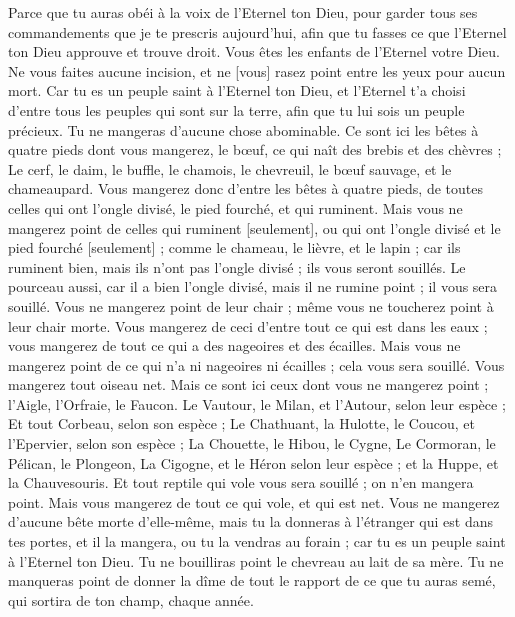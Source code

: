 \begin{multicols}{2}
Parce que tu auras obéi à la voix de l'Eternel ton Dieu, pour garder tous ses commandements que je te prescris aujourd'hui, afin que tu fasses ce que l'Eternel ton Dieu approuve et trouve droit.
\VerseOne{}Vous êtes les enfants de l'Eternel votre Dieu. Ne vous faites aucune incision, et ne [vous] rasez point entre les yeux pour aucun mort.
Car tu es un peuple saint à l'Eternel ton Dieu, et l'Eternel t'a choisi d'entre tous les peuples qui sont sur la terre, afin que tu lui sois un peuple précieux.
Tu ne mangeras d'aucune chose abominable.
Ce sont ici les bêtes à quatre pieds dont vous mangerez, le bœuf, ce qui naît des brebis et des chèvres ;
Le cerf, le daim, le buffle, le chamois, le chevreuil, le bœuf sauvage, et le chameaupard.
Vous mangerez donc d'entre les bêtes à quatre pieds, de toutes celles qui ont l'ongle divisé, le pied fourché, et qui ruminent.
Mais vous ne mangerez point de celles qui ruminent [seulement], ou qui ont l'ongle divisé et le pied fourché [seulement] ; comme le chameau, le lièvre, et le lapin ; car ils ruminent bien, mais ils n'ont pas l'ongle divisé ; ils vous seront souillés.
Le pourceau aussi, car il a bien l'ongle divisé, mais il ne rumine point ; il vous sera souillé. Vous ne mangerez point de leur chair ; même vous ne toucherez point à leur chair morte.
Vous mangerez de ceci d'entre tout ce qui est dans les eaux ; vous mangerez de tout ce qui a des nageoires et des écailles.
Mais vous ne mangerez point de ce qui n'a ni nageoires ni écailles ; cela vous sera souillé.
Vous mangerez tout oiseau net.
Mais ce sont ici ceux dont vous ne mangerez point ; l'Aigle, l'Orfraie, le Faucon.
Le Vautour, le Milan, et l'Autour, selon leur espèce ;
Et tout Corbeau, selon son espèce ;
Le Chathuant, la Hulotte, le Coucou, et l'Epervier, selon son espèce ;
La Chouette, le Hibou, le Cygne,
Le Cormoran, le Pélican, le Plongeon,
La Cigogne, et le Héron selon leur espèce ; et la Huppe, et la Chauvesouris.
Et tout reptile qui vole vous sera souillé ; on n'en mangera point.
Mais vous mangerez de tout ce qui vole, et qui est net.
Vous ne mangerez d'aucune bête morte d'elle-même, mais tu la donneras à l'étranger qui est dans tes portes, et il la mangera, ou tu la vendras au forain ; car tu es un peuple saint à l'Eternel ton Dieu. Tu ne bouilliras point le chevreau au lait de sa mère.
Tu ne manqueras point de donner la dîme de tout le rapport de ce que tu auras semé, qui sortira de ton champ, chaque année.

\end{multicols}
